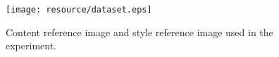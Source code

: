 \documentclass{mva_style}
\begin{document}





\begin{figure}[t]
  \centering
  \texttt{[image: resource/dataset.eps]}
  \caption{Content reference image and style reference image used in the experiment.}
  \label{fig:inputs}
\end{figure}

\end{document}
